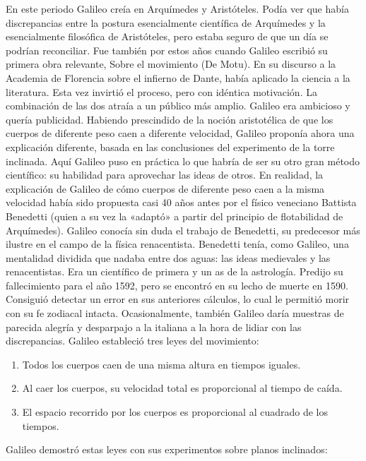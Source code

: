 \documentclass[letterpaper, 10pt, journal]{IEEEtran}
\begin{document}
\newline
En este periodo Galileo creía en Arquímedes y Aristóteles. Podía ver que había discrepancias entre la postura esencialmente científica de Arquímedes y la esencialmente filosófica de Aristóteles, pero estaba seguro de que un día se podrían reconciliar. Fue también por estos años cuando Galileo escribió su primera obra relevante, Sobre el movimiento (De Motu). En su discurso a la Academia de Florencia sobre el infierno de Dante, había aplicado la ciencia a la literatura. Esta vez invirtió el proceso, pero con idéntica motivación. La combinación de las dos atraía a un público más amplio. Galileo era ambicioso y quería publicidad.
\newline
Habiendo prescindido de la noción aristotélica de que los cuerpos de diferente peso caen a diferente velocidad, Galileo proponía ahora una explicación diferente, basada en las conclusiones del experimento de la torre inclinada. Aquí Galileo puso en práctica lo que habría de ser su otro gran método científico: su habilidad para aprovechar las ideas de otros. En realidad, la explicación de Galileo de cómo cuerpos de diferente peso caen a la misma velocidad había sido propuesta casi 40 años antes por el físico veneciano Battista Benedetti (quien a su vez la «adaptó» a partir del principio de flotabilidad de Arquímedes). Galileo conocía sin duda el trabajo de Benedetti, su predecesor más ilustre en el campo de la física renacentista.
\newline
Benedetti tenía, como Galileo, una mentalidad dividida que nadaba entre dos aguas: las ideas medievales y las renacentistas. Era un científico de primera y un as de la astrología. Predijo su fallecimiento para el año 1592, pero se encontró en su lecho de muerte en 1590. Consiguió detectar un error en sus anteriores cálculos, lo cual le permitió morir con su fe zodiacal intacta. Ocasionalmente, también Galileo daría muestras de parecida alegría y desparpajo a la italiana a la hora de lidiar con las discrepancias.
\newline
Galileo estableció tres leyes del movimiento:
\begin{enumerate}
\item Todos los cuerpos caen de una misma altura en tiempos iguales.
\item Al caer los cuerpos, su velocidad total es proporcional al tiempo de caída.
\item El espacio recorrido por los cuerpos es proporcional al cuadrado de los tiempos.
\end{enumerate}
Galileo demostró estas leyes con sus experimentos sobre planos inclinados:
\end{document}
